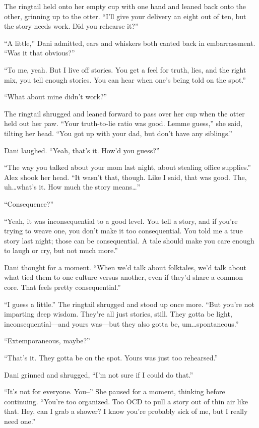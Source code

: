 The ringtail held onto her empty cup with one hand and leaned back onto the other, grinning up to the otter. ``I'll give your delivery an eight out of ten, but the story needs work. Did you rehearse it?''

``A little,'' Dani admitted, ears and whiskers both canted back in embarrassment. ``Was it that obvious?''

``To me, yeah. But I live off stories. You get a feel for truth, lies, and the right mix, you tell enough stories. You can hear when one's being told on the spot.''

``What about mine didn't work?''

The ringtail shrugged and leaned forward to pass over her cup when the otter held out her paw. ``Your truth-to-lie ratio was good. Lemme guess,'' she said, tilting her head. ``You got up with your dad, but don't have any siblings.''

Dani laughed. ``Yeah, that's it. How'd you guess?''

``The way you talked about your mom last night, about stealing office supplies.'' Alex shook her head. ``It wasn't that, though. Like I said, that was good. The, uh\ldots{}what's it. How much the story means\ldots{}''

``Consequence?''

``Yeah, it was inconsequential to a good level. You tell a story, and if you're trying to weave one, you don't make it too consequential. You told me a true story last night; those can be consequential. A tale should make you care enough to laugh or cry, but not much more.''

Dani thought for a moment. ``When we'd talk about folktales, we'd talk about what tied them to one culture versus another, even if they'd share a common core. That feels pretty consequential.''

``I guess a little.'' The ringtail shrugged and stood up once more. ``But you're not imparting deep wisdom. They're all just stories, still. They gotta be light, inconsequential---and yours was---but they also gotta be, um\ldots{}spontaneous.''

``Extemporaneous, maybe?''

``That's it. They gotta be on the spot. Yours was just too rehearsed.''

Dani grinned and shrugged, ``I'm not sure if I could do that.''

``It's not for everyone. You--'' She paused for a moment, thinking before continuing. ``You're too organized. Too OCD to pull a story out of thin air like that. Hey, can I grab a shower? I know you're probably sick of me, but I really need one.''

